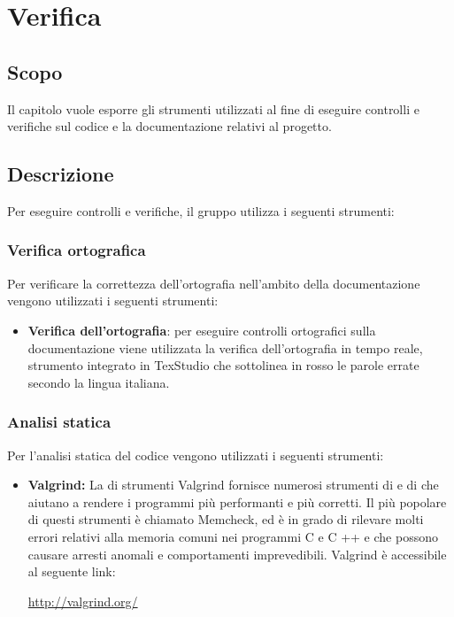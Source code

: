 \documentclass[openany,12pt,a4paper]{report}
\begin{document}

\chapter{Verifica}

\section{Scopo}

Il capitolo vuole esporre gli strumenti utilizzati al fine di eseguire controlli e verifiche sul codice e la documentazione relativi al progetto. 

\section{Descrizione}

Per eseguire controlli e verifiche, il gruppo utilizza i seguenti strumenti:

\subsection{Verifica ortografica}
Per verificare la correttezza dell'ortografia nell'ambito della documentazione vengono utilizzati i seguenti strumenti:

\begin{itemize}
    \item \textbf{Verifica dell'ortografia}: per eseguire controlli ortografici sulla documentazione viene utilizzata la verifica dell’ortografia in tempo reale, strumento integrato in TexStudio che sottolinea in rosso le parole errate secondo la lingua italiana.
\end{itemize}

\subsection{Analisi statica}
Per l’analisi statica del codice vengono utilizzati i seguenti strumenti:
    \begin{itemize}
        \item \textbf{Valgrind:} La  di strumenti Valgrind fornisce numerosi strumenti di  e di  che aiutano a rendere i programmi più performanti e più corretti. Il più popolare di questi strumenti è chiamato Memcheck, ed è in grado di rilevare molti errori relativi alla memoria comuni nei programmi C e C ++ e che possono causare arresti anomali e comportamenti imprevedibili. Valgrind è accessibile al seguente link: \\ \centerline{\url{http://valgrind.org/}}
    \end{itemize}
    
\end{document}
